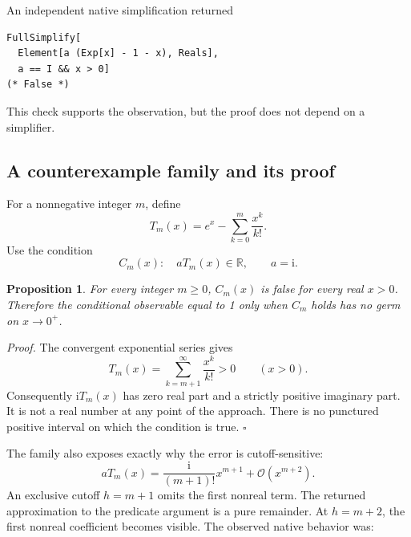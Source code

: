 \documentclass[11pt,letterpaper]{article}
\newcommand{\OO}{\mathcal O}
\newcommand{\RR}{\mathbb R}
\newcommand{\ii}{\mathrm i}
\newtheorem{proposition}{Proposition}
\newenvironment{proof}{\par\noindent\textit{Proof.}}{\hfill\(\square\)\par}
\begin{document}
An independent native simplification returned
\begin{lstlisting}
FullSimplify[
  Element[a (Exp[x] - 1 - x), Reals],
  a == I && x > 0]
(* False *)
\end{lstlisting}
This check supports the observation, but the proof does not depend on a simplifier.

\subsection{A counterexample family and its proof}
For a nonnegative integer \(m\), define
\begin{equation}\label{eq:tail}
 T_m(x)=e^x-\sum_{k=0}^{m}\frac{x^k}{k!}.
\end{equation}
Use the condition
\begin{equation}\label{eq:condition}
 C_m(x):\quad aT_m(x)\in\RR,\qquad a=\ii.
\end{equation}

\begin{proposition}\label{prop:false}
For every integer \(m\ge0\), \(C_m(x)\) is false for every real \(x>0\). Therefore the conditional observable equal to 1 only when \(C_m\) holds has no germ on \(x\to0^+\).
\end{proposition}
\begin{proof}
The convergent exponential series gives
\[
 T_m(x)=\sum_{k=m+1}^{\infty}\frac{x^k}{k!}>0
 \qquad(x>0).
\]
Consequently \(\ii T_m(x)\) has zero real part and a strictly positive imaginary part. It is not a real number at any point of the approach. There is no punctured positive interval on which the condition is true.
\end{proof}

The family also exposes exactly why the error is cutoff-sensitive:
\begin{equation}\label{eq:firstnonreal}
 aT_m(x)=\frac{\ii}{(m+1)!}x^{m+1}+\OO(x^{m+2}).
\end{equation}
An exclusive cutoff \(h=m+1\) omits the first nonreal term. The returned approximation to the predicate argument is a pure remainder. At \(h=m+2\), the first nonreal coefficient becomes visible. The observed native behavior was:
\end{document}
